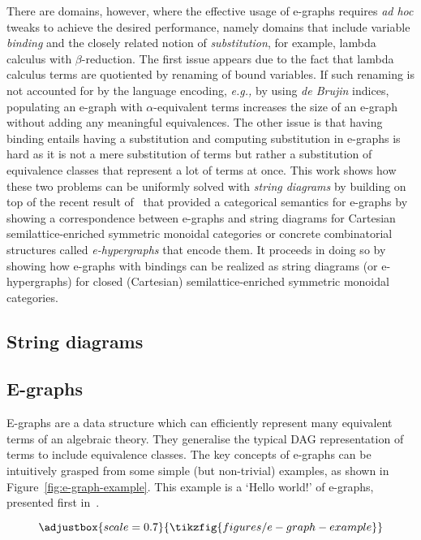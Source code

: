 \documentclass[peerreviewcls]{IEEEtran}
\begin{document}
There are domains, however, where the effective usage of e-graphs requires \textit{ad hoc} tweaks to achieve the desired performance, namely domains that include variable \textit{binding} and the closely related notion of \textit{substitution}, for example, lambda calculus with $\beta$-reduction.
The first issue appears due to the fact that lambda calculus terms are quotiented by renaming of bound variables.
If such renaming is not accounted for by the language encoding, \textit{e.g.,} by using \textit{de Brujin} indices, populating an e-graph with $\alpha$-equivalent terms increases the size of an e-graph without adding any meaningful equivalences.
The other issue is that having binding entails having a substitution and computing substitution in e-graphs is hard as it is not a mere substitution of terms but rather a substitution of equivalence classes that represent a lot of terms at once.
This work shows how these two problems can be uniformly solved with \textit{string diagrams} by building on top of the recent result of~\cite{ghica2024equivalencehypergraphsegraphsmonoidal} that provided a categorical semantics for e-graphs by showing a correspondence between e-graphs and string diagrams for Cartesian semilattice-enriched symmetric monoidal categories or concrete combinatorial structures called \textit{e-hypergraphs} that encode them.
It proceeds in doing so by showing how e-graphs with bindings can be realized as string diagrams (or e-hypergraphs) for closed (Cartesian) semilattice-enriched symmetric monoidal categories.

\subsection{String diagrams}

\subsection{E-graphs}

E-graphs are a data structure which can efficiently represent many equivalent terms of an algebraic theory.  They generalise the typical DAG representation of terms to include equivalence classes.
The key concepts of e-graphs can be intuitively grasped from some simple (but non-trivial) examples, as shown in Figure~\ref{fig:e-graph-example}.
This example is a `Hello world!' of e-graphs, presented first in~\cite{EggPaper}.

\begin{figure*}
\[
\adjustbox{scale=0.7}{
\tikzfig{figures/e-graph-example}
}
\]
\caption{E-graph example (top) and its equivalent string diagram representation (bottom)}
\label{fig:e-graph-example}
\end{figure*}
\end{document}
